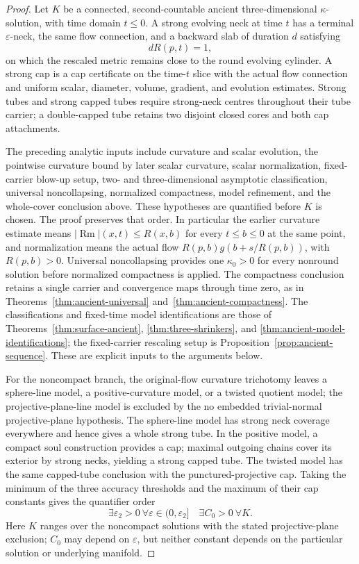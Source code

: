 \begin{proof}
Let $K$ be a connected, second-countable ancient three-dimensional
$\kappa$-solution, with time domain $t\le0$.  A strong evolving neck at time
$t$ has a terminal $\varepsilon$-neck, the same flow connection, and a
backward slab of duration $d$ satisfying
\[
 dR(p,t)=1,
\]
on which the rescaled metric remains close to the round evolving cylinder.
A strong cap is a cap certificate on the time-$t$ slice with the actual flow
connection and uniform scalar, diameter, volume, gradient, and evolution
estimates.  Strong tubes and strong capped tubes require strong-neck centres
throughout their tube carrier; a double-capped tube retains two disjoint
closed cores and both cap attachments.

The preceding analytic inputs include curvature and scalar evolution, the
pointwise curvature bound by later scalar curvature, scalar normalization,
fixed-carrier blow-up setup, two- and three-dimensional asymptotic
classification, universal noncollapsing, normalized compactness, model
refinement, and the whole-cover conclusion above.  These hypotheses are
quantified before $K$ is chosen.  The proof preserves that order.
In particular the earlier curvature estimate means
$|\operatorname{Rm}|(x,t)\le R(x,b)$ for every $t\le b\le0$ at the
same point, and normalization means the actual flow
$R(p,b)g(b+s/R(p,b))$, with $R(p,b)>0$.  Universal noncollapsing
provides one $\kappa_0>0$ for every nonround solution before normalized
compactness is applied.  The compactness conclusion retains a single
carrier and convergence maps through time zero, as in
Theorems~\ref{thm:ancient-universal} and~\ref{thm:ancient-compactness}.
The classifications and fixed-time model identifications are those of
Theorems~\ref{thm:surface-ancient}, \ref{thm:three-shrinkers}, and
\ref{thm:ancient-model-identifications}; the fixed-carrier rescaling setup
is Proposition~\ref{prop:ancient-sequence}.  These are explicit inputs
to the arguments below.

For the noncompact branch, the original-flow curvature trichotomy leaves a
sphere-line model, a positive-curvature model, or a twisted quotient model;
the projective-plane-line model is excluded by the no embedded trivial-normal
projective-plane hypothesis.  The sphere-line model has strong neck coverage
everywhere and hence gives a whole strong tube.  In the positive model, a
compact soul construction provides a cap; maximal outgoing chains cover its
exterior by strong necks, yielding a strong capped tube.  The twisted model
has the same capped-tube conclusion with the punctured-projective cap.  Taking
the minimum of the three accuracy thresholds and the maximum of their cap
constants gives the quantifier order
\[
 \exists\varepsilon_2>0\ \forall\varepsilon\in(0,\varepsilon_2]\quad
 \exists C_0>0\ \forall K.
\]
Here $K$ ranges over the noncompact solutions with the stated projective-plane
exclusion; $C_0$ may depend on $\varepsilon$, but neither constant depends on
the particular solution or underlying manifold.


\end{proof}
